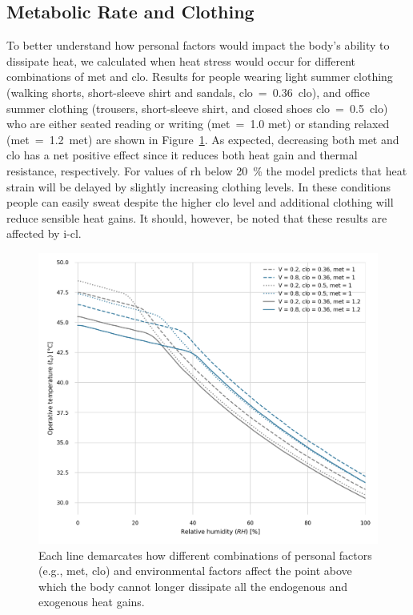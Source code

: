 \subsection{Metabolic Rate and Clothing}\label{subsec:met-clo}

To better understand how personal factors would impact the body's ability to dissipate heat, we calculated when heat stress would occur for different combinations of \ac{met} and \ac{clo}.
Results for people wearing light summer clothing (walking shorts, short-sleeve shirt and sandals, \acs{clo}~=~0.36~clo), and office summer clothing (trousers, short-sleeve shirt, and closed shoes \acs{clo}~=~0.5~clo) who are either seated reading or writing (\ac{met}~=~1.0 met) or standing relaxed (\ac{met}~=~1.2~met) are shown in Figure~\ref{fig:met_clo}.
As expected, decreasing both \ac{met} and \ac{clo} has a net positive effect since it reduces both heat gain and thermal resistance, respectively.
For values of \ac{rh} below 20~\% the model predicts that heat strain will be delayed by slightly increasing clothing levels.
In these conditions people can easily sweat despite the higher clo level and additional clothing will reduce sensible heat gains.
It should, however, be noted that these results are affected by \ac{i-cl}.

\begin{figure}[thb!]
    \centering
    \includegraphics[width=\textwidth]{figures/met_clo}
    \caption{Each line demarcates how different combinations of personal factors (e.g., \ac{met}, \ac{clo}) and environmental factors affect the point above which the body cannot longer dissipate all the endogenous and exogenous heat gains.}
    \label{fig:met_clo}
\end{figure}

